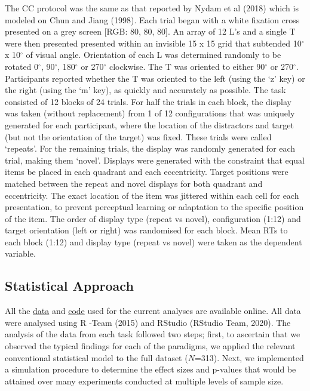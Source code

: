 \documentclass[
  man]{apa6}
\begin{document}
The CC protocol was the same as that reported by Nydam et al (2018) which is modeled on Chun and Jiang (1998). Each trial began with a white fixation cross presented on a grey screen {[}RGB: 80, 80, 80{]}. An array of 12 L's and a single T were then presented presented within an invisible 15 x 15 grid that subtended 10\(^\circ\) x 10\(^\circ\) of visual angle. Orientation of each L was determined randomly to be rotated 0\(^\circ\), 90\(^\circ\), 180\(^\circ\) or 270\(^\circ\) clockwise. The T was oriented to either 90\(^\circ\) or 270\(^\circ\). Participants reported whether the T was oriented to the left (using the `z' key) or the right (using the `m' key), as quickly and accurately as possible. The task consisted of 12 blocks of 24 trials. For half the trials in each block, the display was taken (without replacement) from 1 of 12 configurations that was uniquely generated for each participant, where the location of the distractors and target (but not the orientation of the target) was fixed. These trials were called `repeats'. For the remaining trials, the display was randomly generated for each trial, making them `novel'. Displays were generated with the constraint that equal items be placed in each quadrant and each eccentricity. Target positions were matched between the repeat and novel displays for both quadrant and eccentricity. The exact location of the item was jittered within each cell for each presentation, to prevent perceptual learning or adaptation to the specific position of the item. The order of display type (repeat vs novel), configuration (1:12) and target orientation (left or right) was randomised for each block. Mean RTs to each block (1:12) and display type (repeat vs novel) were taken as the dependent variable.

\hypertarget{statistical-approach}{%
\subsection{Statistical Approach}\label{statistical-approach}}

All the \href{https://doi.org/10.48610/b63ecc2}{data} and \href{https://github.com/kel-github/Super-Effects}{code} used for the current analyses are available online. All data were analysed using R -Team (2015) and RStudio (RStudio Team, 2020). The analysis of the data from each task followed two steps; first, to ascertain that we observed the typical findings for each of the paradigms, we applied the relevant conventional statistical model to the full dataset (\(N\)=313). Next, we implemented a simulation procedure to determine the effect sizes and p-values that would be attained over many experiments conducted at multiple levels of sample size.
\end{document}

